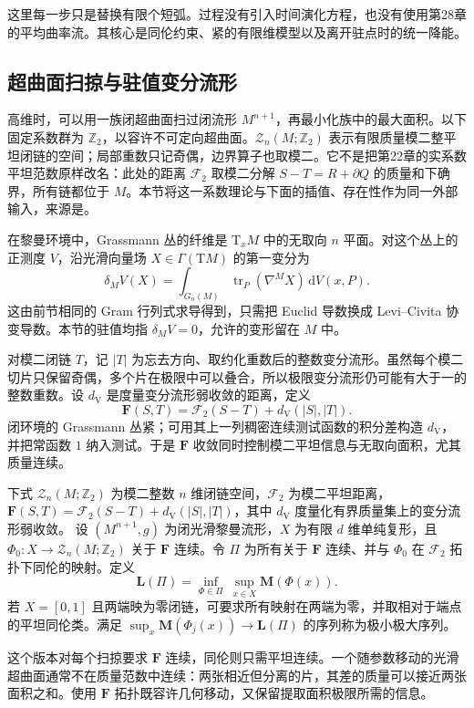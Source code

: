 \ProseParagraphBreak
这里每一步只是替换有限个短弧。过程没有引入时间演化方程，也没有使用第28章的平均曲率流。其核心是同伦约束、紧的有限维模型以及离开驻点时的统一降能。

\subsection{超曲面扫掠与驻值变分流形}
\label{g3:subsec:2305:04}
高维时，可以用一族闭超曲面扫过闭流形 \(M^{n+1}\)，再最小化族中的最大面积。以下固定系数群为 \(\mathbb Z_2\)，以容许不可定向超曲面。\(\mathcal Z_n(M;\mathbb Z_2)\) 表示有限质量模二整平坦闭链的空间；局部重数只记奇偶，边界算子也取模二。它不是把第22章的实系数平坦范数原样改名：此处的距离 \(\mathcal F_2\) 取模二分解 \(S-T=R+\partial Q\) 的质量和下确界，所有链都位于 \(M\)。本节将这一系数理论与下面的插值、存在性作为同一外部输入，来源是\cite[第2--3节，第469--473页]{MarquesNeves2016IndexMultiplicity}。

\ProseParagraphBreak
在黎曼环境中，Grassmann 丛的纤维是 \(\mathrm T_xM\) 中的无取向 \(n\) 平面。对这个丛上的正测度 \(V\)，沿光滑向量场 \(X\in\Gamma(\mathrm TM)\) 的第一变分为
\[
	\delta_MV(X)=\int_{G_n(M)}\operatorname{tr}_P(\nabla^M X)\,\mathrm dV(x,P).
\]
这由前节相同的 Gram 行列式求导得到，只需把 Euclid 导数换成 Levi--Civita 协变导数。本节的驻值均指 \(\delta_MV=0\)，允许的变形留在 \(M\) 中。

\ProseParagraphBreak
对模二闭链 \(T\)，记 \(|T|\) 为忘去方向、取约化重数后的整数变分流形。虽然每个模二切片只保留奇偶，多个片在极限中可以叠合，所以极限变分流形仍可能有大于一的整数重数。设 \(d_{\mathrm V}\) 是度量变分流形弱收敛的距离，定义
\[
	\mathbf F(S,T)=\mathcal F_2(S-T)+d_{\mathrm V}(|S|,|T|).
\]
闭环境的 Grassmann 丛紧；可用其上一列稠密连续测试函数的积分差构造 \(d_{\mathrm V}\)，并把常函数 \(1\) 纳入测试。于是 \(\mathbf F\) 收敛同时控制模二平坦信息与无取向面积，尤其质量连续。

\begin{definition}\label{g3:def:hypersurface-sweepout-width}
	下式 \(\mathcal Z_n(M;\mathbb Z_2)\) 为模二整数 \(n\) 维闭链空间，\(\mathcal F_2\) 为模二平坦距离，\(\mathbf F(S,T)=\mathcal F_2(S-T)+d_{\mathrm V}(|S|,|T|)\)，其中 \(d_{\mathrm V}\) 度量化有界质量集上的变分流形弱收敛。
	设 \((M^{n+1},g)\) 为闭光滑黎曼流形，\(X\) 为有限 \(d\) 维单纯复形，且 \(\Phi_0:X\to\mathcal Z_n(M;\mathbb Z_2)\) 关于 \(\mathbf F\) 连续。令 \(\Pi\) 为所有关于 \(\mathbf F\) 连续、并与 \(\Phi_0\) 在 \(\mathcal F_2\) 拓扑下同伦的映射。定义
	\[
		\mathbf L(\Pi)=\inf_{\Phi\in\Pi}\ \sup_{x\in X}\mathbf M(\Phi(x)).
	\]
	若 \(X=[0,1]\) 且两端映为零闭链，可要求所有映射在两端为零，并取相对于端点的平坦同伦类。满足 \(\sup_x\mathbf M(\Phi_j(x))\to\mathbf L(\Pi)\) 的序列称为极小极大序列。
\end{definition}
这个版本对每个扫掠要求 \(\mathbf F\) 连续，同伦则只需平坦连续。一个随参数移动的光滑超曲面通常不在质量范数中连续：两张相近但分离的片，其差的质量可以接近两张面积之和。使用 \(\mathbf F\) 拓扑既容许几何移动，又保留提取面积极限所需的信息。

